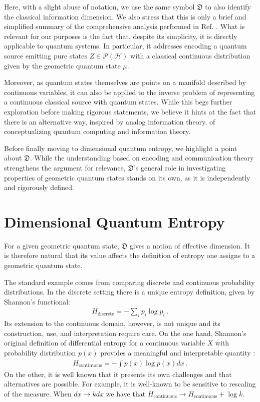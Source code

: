 \documentclass[draft,nofootinbib,pre,twocolumn,showkeys,superscriptaddress,preprintnumbers,floatfix]{revtex4-1}
\newcommand{\1}{\mathbbm{1}}
\newcommand{\PH}{\mathcal{P}(\mathcal{H})}
\newcommand{\DD}{\mathfrak{D}}
\begin{document}
Here, with a slight abuse of notation, we use the same symbol $\mathfrak{D}$ to
also identify the classical information dimension. We also stress that this is
only a brief and simplified summary of the comprehensive analysis performed in
Ref. \cite{Wu10}. What is relevant for our purposes is the fact that, despite
its simplicity, it is directly applicable to quantum systems. In particular, it
addresses encoding a quantum source emitting pure states $Z \in \PH$ with
a classical continuous distribution given by the geometric quantum state $\mu$.

Moreover, as quantum states themselves are points on a manifold described by
continuous variables, it can also be applied to the inverse problem of
representing a continuous classical source with quantum states. While this begs
further exploration before making rigorous statements, we believe it hints at
the fact that there is an alternative way, inspired by analog information
theory, of conceptualizing quantum computing and information theory.

Before finally moving to dimensional quantum entropy, we highlight a point about
$\mathfrak{D}$. While the understanding based on encoding and communication
theory strengthens the argument for relevance, $\mathfrak{D}$'s general role in
investigating properties of geometric quantum states stands on its own, as it is
independently and rigorously defined.

\section{Dimensional Quantum Entropy}
\label{sec:GDQE}

For a given geometric quantum state, $\DD$ gives a notion of effective
dimension. It is therefore natural that its value affects the definition of
entropy one assigns to a geometric quantum state.

The standard example comes from comparing discrete and continuous probability
distributions. In the discrete setting there is a unique entropy definition,
given by Shannon's functional:
\begin{align}
H_{\mathrm{discrete}} = - \sum_i p_i \log p_i
  ~.
\label{eq:DiscreteEntropy}
\end{align}
Its extension to the continuous domain, however, is not unique and its
construction, use, and interpretation require care. On the one hand, Shannon's
original definition of differential entropy for a continuous variable $X$ with
probability distribution $p(x)$ provides a meaningful and interpretable
quantity \cite{Shan48a}:
\begin{align}
H_{\mathrm{continuous}} = - \int p(x) \log p(x) dx
  ~.
\label{eq:DiffEntropy}
\end{align}
On the other, it is well known that it presents its own challenges and that
alternatives are possible. For example, it is well-known to be sensitive to
rescaling of the measure. When $dx \to k dx$ we have that
$H_{\mathrm{continuous}} \to H_{\mathrm{continuous}} + \log k$.
\end{document}
